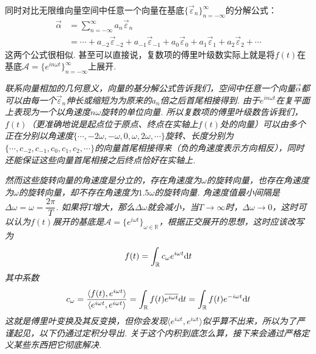 \documentclass[UTF8]{ctexart}
\newcommand{\trm}[1]{{\rm #1}}
\begin{document}
同时对比无限维向量空间中任意一个向量在基底\(\{\vec{\varepsilon}_n\}_{n=-\infty}^{\infty}\)的分解公式：
\begin{align*}
    \vec{\alpha} &= \sum_{n=-\infty}^{\infty}a_n\vec{\varepsilon}_n \\
    &= \cdots + a_{-2}\vec{\varepsilon}_{-2} + a_{-1}\vec{\varepsilon}_{-1} + a_{0}\vec{\varepsilon}_{0} + a_{1}\vec{\varepsilon}_{1} + a_{2}\vec{\varepsilon}_{2} + \cdots
\end{align*}
这两个公式很相似. 甚至可以直接说，复数项的傅里叶级数实际上就是将\(f(t)\)在基底\(\mathcal{A}=\{e^{in\omega t}\}_{n=-\infty}^{\infty}\)上展开.

\textit{
    联系向量相加的几何意义，向量的基分解公式告诉我们，空间中任意一个向量\(\vec{\alpha}\)都可以由每一个\(\vec{\varepsilon}_n\)伸长或缩短为为原来的\(a_n\)倍之后首尾相接得到. 由于\(e^{in\omega t}\)在复平面上表现为一个以角速度\(n\omega\)旋转的单位向量. 所以复数项的傅里叶级数告诉我们，\(f(t)\)（更准确地说是起点位于原点、终点在实轴上\(f(t)\)处的向量）可以由多个正在分别以角速度\(\{\cdots, -2\omega, -\omega, 0, \omega, 2\omega, \cdots\}\)旋转、长度分别为\(\{\cdots, c_{-2}, c_{-1}, c_0, c_1, c_2, \cdots\}\)的向量首尾相接得来（负的角速度表示方向相反），同时还能保证这些向量首尾相接之后终点恰好在实轴上.
}

\textit{
    然而这些旋转向量的角速度是分立的，存在角速度为\(\omega\)的旋转向量，也存在角速度为\(\omega\)的旋转向量，却不存在角速度为\(1.5\omega\)的旋转向量. 角速度值最小间隔是\(\Delta \omega = \omega =\dfrac{2\pi}{T}\). 如果将\(T\)增大，那么\(\Delta \omega\)就会减小，当\(T\to\infty\)时，\(\Delta \omega \to 0\)，这时可以认为\(f(t)\)展开的基底是\(\mathcal{A}=\{e^{i\omega t}\}_{\omega \in \mathbb{R}}\)，根据正交展开的思想，这时应该改写为
    \[f(t)=\int_{\mathbb{R}}c_\omega e^{i\omega t}\trm{d}t\]
    其中系数
    \[c_\omega = \frac{\langle f(t), e^{i\omega t} \rangle}{\langle e^{i\omega t},e^{i \omega t} \rangle} = \int_{\mathbb{R}}f(t)\overline{e^{i\omega t}}\trm{d}t=\int_{\mathbb{R}}f(t)e^{-i\omega t}\trm{d}t\]
    这就是傅里叶变换及其反变换，但你会发现\(\langle e^{i\omega t},e^{i \omega t} \rangle\)似乎算不出来，所以为了严谨起见，以下仍通过定积分导出. 关于这个内积到底怎么算，接下来会通过严格定义某些东西把它彻底解决.
}

\vspace{0.5cm}
\end{document}
